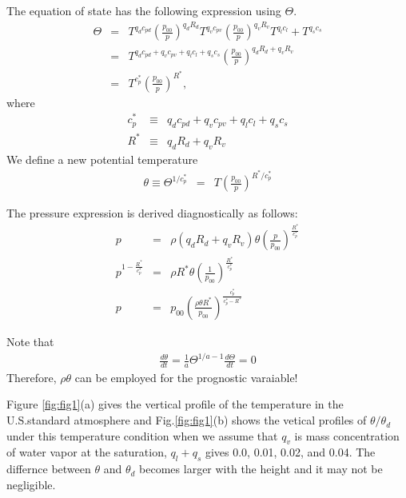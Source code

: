The equation of state has the following expression using $\Theta$.
\begin{eqnarray}
\Theta &=&
T^{q_d c_{pd}} \left(\frac{p_{00}}{p}\right)^{q_d R_d}
T^{q_v c_{pv}} \left(\frac{p_{00}}{p}\right)^{q_v R_v}
T^{q_l c_l}  + T^{q_s c_s} \\
&=&
T^{q_d c_{pd} +q_vc_{pv}+q_lc_l+q_sc_s}
\left(\frac{p_{00}}{p}\right)^{q_d R_d + q_v R_v} \\
&=&
T^{c_p^*}\left(\frac{p_{00}}{p}\right)^{R^*},
\end{eqnarray}
where
\begin{eqnarray}
  c_p^* &\equiv& q_d c_{pd} +q_vc_{pv}+q_lc_l+q_sc_s\\
  R^* &\equiv& q_d R_d + q_v R_v
\end{eqnarray}
We define a new potential temperature
\begin{eqnarray}
\theta \equiv \Theta^{1/c_p^*} &=& T \left(\frac{p_{00}}{p}\right)^{R^*/c_p^*}
\end{eqnarray}

The pressure expression is derived diagnostically as follows:
\begin{eqnarray}
p&=&\rho (q_d R_d + q_v R_v) \theta \left(\frac{p}{p_{00}}\right)^{\frac{R^*}{c_{p}^*}}\\
p^{1-\frac{R^*}{c_{p}^*}}&=&\rho R^* \theta \left(\frac{1}{p_{00}}\right)^{\frac{R^*}{c_{p}^*}}\\
p&=&p_{00}\left(\frac{\rho \theta R^*}{p_{00}} \right)^{\frac{c_{p}^*}{c_{p}^*- R^*}} \label{eq: pressure}
\end{eqnarray}

Note that
\begin{eqnarray}
  \frac{d \theta}{dt} = \frac{1}{a} \Theta^{1/a-1} \frac{d \Theta}{dt} = 0
  \label{eq:theta_theta_relation}
\end{eqnarray}
Therefore, $\rho \theta$ can be employed for the prognostic varaiable!

Figure \ref{fig:fig1}(a) gives the vertical profile of the temperature
in the U.S.standard atmosphere and Fig.\ref{fig:fig1}(b) shows
the vetical profiles of $\theta/\theta_d$ under this temperature condition
when we assume that $q_v$ is mass concentration of water vapor at the saturation,
$q_l+q_s$ gives 0.0, 0.01, 0.02, and 0.04.
The differnce between $\theta$ and $\theta_d$ becomes
larger with the height and it may not be negligible.

